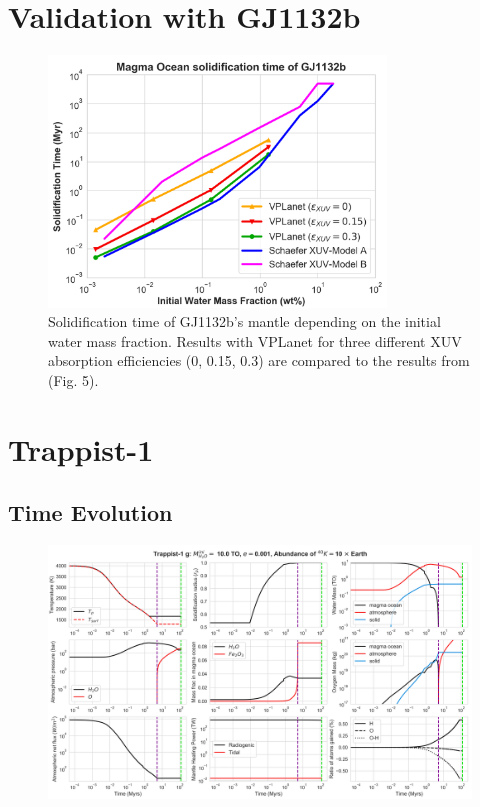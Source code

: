 \documentclass[abstract=on, letterpaper]{scrartcl}
\numberwithin{equation}{section}
\begin{document}
\section{Validation with GJ1132b}
\label{GJ1132b}

\begin{figure}[H]
	\includegraphics[width=0.8\textwidth]{../Fig_GJ1132b/SolidTime_MassFracWater_No5_ConstThermTemp_400K}
	\caption{Solidification time of GJ1132b's mantle depending on the initial water mass fraction. Results with VPLanet for three different XUV absorption efficiencies (0, 0.15, 0.3) are compared to the results from \citet{Schaefer2016} (Fig. 5).}
	\label{SolidTimeGJ}
\end{figure}

\section{Trappist-1}

\subsection{Time Evolution}
\begin{figure}[H]
	\includegraphics[width=\textwidth]{../Fig_Trappist1_TimeEvolution/Trappist-1_g_10TO_ecc_001_40K_10}
	\caption{}
	\label{TR1g_Time}
\end{figure}
\end{document}
